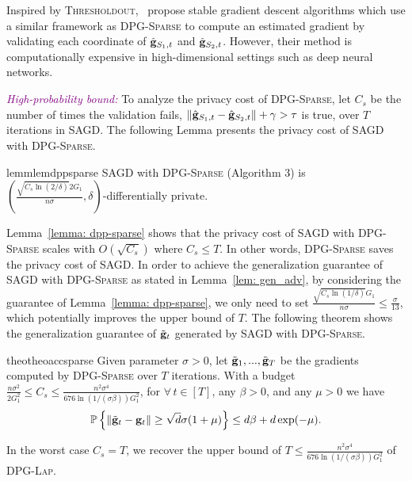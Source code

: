 \documentclass[11pt]{article}
\begin{document}
Inspired by \textsc{Thresholdout},~\citet{zhch2018} propose stable gradient descent algorithms which use a similar framework as \textsc{DPG-Sparse} to compute an estimated gradient by validating each coordinate of $\hat {\mathbf{g}}_{S_1,t}$ and $\hat {\mathbf{g}}_{S_2,t}$. 
However, their method is computationally expensive in high-dimensional settings such as deep neural networks. 

\textcolor{purple}{\textit{High-probability bound:}}
To analyze the privacy cost of \textsc{DPG-Sparse}, let $C_{s}$ be the number of times the validation fails, \ie $\| \hat {\mathbf{g}}_{S_1,t} - \hat {\mathbf{g}}_{S_2,t}\| + \gamma >  \tau$ is true, over $T$ iterations in \textsc{SAGD}. The following Lemma presents the privacy cost of \textsc{SAGD} with \textsc{DPG-Sparse}.
\begin{restatable}{lemm}{lemdppsparse}
\label{lemma: dpp-sparse}
\textsc{SAGD} with \textsc{DPG-Sparse}  (Algorithm 3) is  
$(\frac{\sqrt{C_{s} \ln(2/\delta)} 2G_1}{n\sigma}, \delta)$-differentially private. 
\end{restatable}
Lemma~\ref{lemma: dpp-sparse} shows that the privacy cost of  \textsc{SAGD} with \textsc{DPG-Sparse} scales with $O(\sqrt{C_{s}})$ where $C_{s} \leq T$. In other words, \textsc{DPG-Sparse} saves the privacy cost of \textsc{SAGD}. In order to achieve the generalization guarantee of \textsc{SAGD} with \textsc{DPG-Sparse} as stated in Lemma~\ref{lem: gen_adv},  by considering the guarantee of Lemma~\ref{lemma: dpp-sparse},  we only need to set $\frac{\sqrt{C_{s} \ln(1/\delta)} G_1}{n\sigma} \leq \frac{\sigma}{13}$, which potentially improves the upper bound of $T$. 
The following theorem shows the generalization guarantee of $\tilde {\mathbf{g}}_t$ generated by \textsc{SAGD} with \textsc{DPG-Sparse}.
\begin{restatable}{theo}{theoaccsparse}
\label{thm: acc_sparse}
Given parameter $\sigma > 0$, let $\tilde {\mathbf{g}}_1,...,  \tilde {\mathbf{g}}_T$ be the gradients computed by \textsc{DPG-Sparse} over $T$ iterations. With a budget $ \frac{n\sigma^2}{2G_1^2} \leq C_{s} \leq\frac{n^2 \sigma^4}{676 \ln(1/(\sigma \beta))G_1^2}$, for $\forall\, t \in [T]$, any $\beta > 0$, and any $\mu > 0$ we have 
        \begin{equation*}
    \mathbb{P}\left\{\|\tilde {\mathbf{g}}_t - \mathbf{g}_t\| \geq \sqrt{d}\sigma(1+\mu)\right\} \leq d\beta + d\exp(-\mu).
    \end{equation*}
\end{restatable}
In the worst case $C_{s} = T$, we recover the upper bound of $T \leq \frac{n^2 \sigma^4}{676 \ln(1/(\sigma \beta))G_1^2}$ of \textsc{DPG-Lap}.
\end{document}
